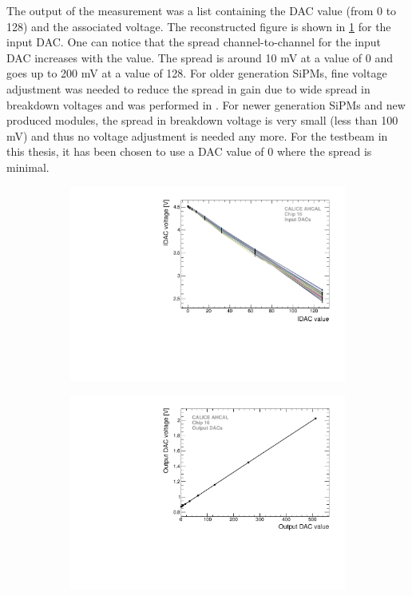 The output of the measurement was a list containing the DAC value (from 0 to 128) and the associated voltage. The reconstructed figure is shown in \ref{fig:IDAC} for the input DAC. One can notice that the spread channel-to-channel for the input DAC increases with the value. The spread is around 10 mV at a value of 0 and goes up to 200 mV at a value of 128. For older generation SiPMs, fine voltage adjustment was needed to reduce the spread in gain due to wide spread in breakdown voltages and was performed in \cite{Hartbrich2012}. For newer generation SiPMs and new produced modules, the spread in breakdown voltage is very small (less than 100 mV) and thus no voltage adjustment is needed any more. For the testbeam in this thesis, it has been chosen to use a DAC value of 0 where the spread is minimal.

\begin{figure}[htbp!]
  \centering
  \begin{subfigure}[t]{0.49\textwidth}
    \includegraphics[width=1.\linewidth]{../Thesis_Plots/Commissioning/Plots/IDACs_Chip16.pdf}
    \caption{} \label{fig:IDAC}
  \end{subfigure}
  \hfill
  \begin{subfigure}[t]{0.49\textwidth}
    \includegraphics[width=1.\linewidth]{../Thesis_Plots/Commissioning/Plots/OutDACs_Chip16.pdf}

\end{subfigure}
\end{figure}
